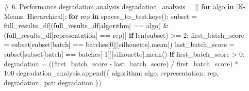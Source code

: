 \documentclass[
  letterpaper,
  DIV=11,
  numbers=noendperiod]{scrartcl}
\newenvironment{Shaded}{\begin{snugshade}}{\end{snugshade}}
\newcommand{\BuiltInTok}[1]{\textcolor[rgb]{0.00,0.23,0.31}{#1}}
\newcommand{\CommentTok}[1]{\textcolor[rgb]{0.37,0.37,0.37}{#1}}
\newcommand{\ControlFlowTok}[1]{\textcolor[rgb]{0.00,0.23,0.31}{\textbf{#1}}}
\newcommand{\DecValTok}[1]{\textcolor[rgb]{0.68,0.00,0.00}{#1}}
\newcommand{\KeywordTok}[1]{\textcolor[rgb]{0.00,0.23,0.31}{\textbf{#1}}}
\newcommand{\NormalTok}[1]{\textcolor[rgb]{0.00,0.23,0.31}{#1}}
\newcommand{\OperatorTok}[1]{\textcolor[rgb]{0.37,0.37,0.37}{#1}}
\newcommand{\StringTok}[1]{\textcolor[rgb]{0.13,0.47,0.30}{#1}}
\renewenvironment{Shaded}{%
  \begin{tcolorbox}[%
    enhanced,%
    colback=codebg,%
    colframe=codebg,%
    borderline west={3pt}{0pt}{sectionblue},%
    fontupper=\small\ttfamily,%
    boxrule=0pt,%
    arc=0pt,%
    boxsep=5pt,%
    left=2mm,%
    right=2mm,%
    top=2mm,%
    bottom=2mm%
  ]%
}{%
  \end{tcolorbox}%
}
\begin{document}
\begin{Shaded}
\begin{Highlighting}[]
\CommentTok{\# 6. Performance degradation analysis}
\NormalTok{degradation\_analysis }\OperatorTok{=}\NormalTok{ []}
\ControlFlowTok{for}\NormalTok{ algo }\KeywordTok{in}\NormalTok{ [}\StringTok{\textquotesingle{}K{-}Means\textquotesingle{}}\NormalTok{, }\StringTok{\textquotesingle{}Hierarchical\textquotesingle{}}\NormalTok{]:}
    \ControlFlowTok{for}\NormalTok{ rep }\KeywordTok{in}\NormalTok{ spaces\_to\_test.keys():}
\NormalTok{        subset }\OperatorTok{=}\NormalTok{ full\_results\_df[(full\_results\_df[}\StringTok{\textquotesingle{}algorithm\textquotesingle{}}\NormalTok{] }\OperatorTok{==}\NormalTok{ algo) }\OperatorTok{\&} 
\NormalTok{                                (full\_results\_df[}\StringTok{\textquotesingle{}representation\textquotesingle{}}\NormalTok{] }\OperatorTok{==}\NormalTok{ rep)]}
        \ControlFlowTok{if} \BuiltInTok{len}\NormalTok{(subset) }\OperatorTok{\textgreater{}=} \DecValTok{2}\NormalTok{:}
\NormalTok{            first\_batch\_score }\OperatorTok{=}\NormalTok{ subset[subset[}\StringTok{\textquotesingle{}batch\textquotesingle{}}\NormalTok{] }\OperatorTok{==}\NormalTok{ batches[}\DecValTok{0}\NormalTok{]][}\StringTok{\textquotesingle{}silhouette\textquotesingle{}}\NormalTok{].mean()}
\NormalTok{            last\_batch\_score }\OperatorTok{=}\NormalTok{ subset[subset[}\StringTok{\textquotesingle{}batch\textquotesingle{}}\NormalTok{] }\OperatorTok{==}\NormalTok{ batches[}\OperatorTok{{-}}\DecValTok{1}\NormalTok{]][}\StringTok{\textquotesingle{}silhouette\textquotesingle{}}\NormalTok{].mean()}
            \ControlFlowTok{if}\NormalTok{ first\_batch\_score }\OperatorTok{\textgreater{}} \DecValTok{0}\NormalTok{:}
\NormalTok{                degradation }\OperatorTok{=}\NormalTok{ ((first\_batch\_score }\OperatorTok{{-}}\NormalTok{ last\_batch\_score) }\OperatorTok{/}\NormalTok{ first\_batch\_score) }\OperatorTok{*} \DecValTok{100}
\NormalTok{                degradation\_analysis.append(\{}
                    \StringTok{\textquotesingle{}algorithm\textquotesingle{}}\NormalTok{: algo,}
                    \StringTok{\textquotesingle{}representation\textquotesingle{}}\NormalTok{: rep,}
                    \StringTok{\textquotesingle{}degradation\_pct\textquotesingle{}}\NormalTok{: degradation}
\NormalTok{                \})}


\end{Highlighting}
\end{Shaded}
\end{document}
